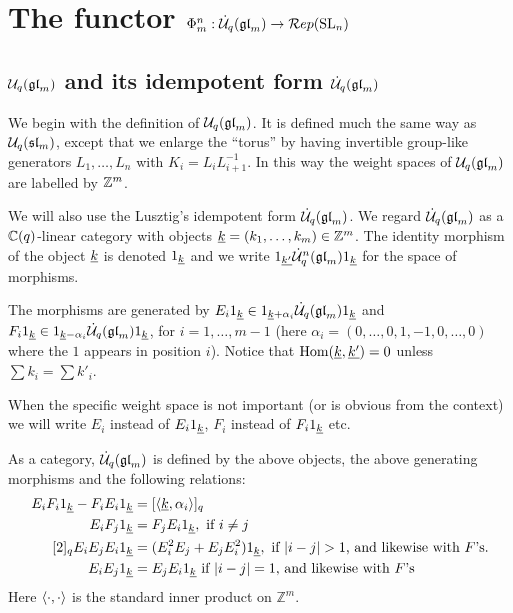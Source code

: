 \documentclass[10pt,leqno]{article}
\begin{document}
\section{The functor $\Phi_m^n:\dot{{\mathcal{U}}}_q({\mathfrak{gl}}_m) \rightarrow \mathcal{R}ep({\rm{SL}}_n)$}\label{sec:phi}

\subsection{$ \mathcal{U}_q({\mathfrak{gl}}_m)$ and its idempotent form $\dot{{\mathcal{U}}}_q({\mathfrak{gl}}_m)$}\label{sec:idemform}
We begin with the definition of $ \mathcal{U}_q({\mathfrak{gl}}_m)$.  It is defined much the same way as $ \mathcal{U}_q({\mathfrak{sl}}_m) $, except that we enlarge the ``torus'' by having invertible group-like generators $ L_1, \dots, L_n $ with $ K_i = L_i L_{i+1}^{-1} $.  In this way the weight spaces of $ \mathcal{U}_q({\mathfrak{gl}}_m) $ are labelled by $ {\mathbb{Z}}^m $.

We will also use the Lusztig's idempotent form $ \dot{{\mathcal{U}}}_q({\mathfrak{gl}}_m) $.
We regard $\dot{{\mathcal{U}}}_q({\mathfrak{gl}}_m)$ as a ${\mathbb{C}}(q)$-linear category with objects $ {\underline{k}} = (k_1, \dots, k_m) \in \mathbb Z^m $.  The identity morphism of the object ${\underline{k}}$ is denoted $1_{\underline{k}}$  and we write $ 1_{\underline{k'}} \dot{{\mathcal{U}}}_q^n({\mathfrak{gl}}_m) 1_{\underline{k}}$ for the space of morphisms.

The morphisms are generated by $E_i 1_{{\underline{k}}} \in 1_{{\underline{k}} + \alpha_i} \dot{{\mathcal{U}}}_q({\mathfrak{gl}}_m) 1_{{\underline{k}}} $ and $ F_i 1_{{\underline{k}}} \in 1_{{\underline{k}} - \alpha_i} \dot{{\mathcal{U}}}_q({\mathfrak{gl}}_m) 1_{{\underline{k}}}$, for $i=1, \dots, m-1$ (here $\alpha_i = (0,\dots,0,1,-1,0,\dots,0)$ where the $1$ appears in position $i$).  Notice that $\operatorname{Hom}({\underline{k}}, {\underline{k'}}) = 0 $ unless $\sum k_i = \sum k'_i$.

\begin{rem} When the specific weight space is not important (or is obvious from the context) we will write $E_i$ instead of $E_i 1_{{\underline{k}}}$, $F_i$ instead of $F_i 1_{{\underline{k}}}$ etc.
\end{rem}

As a category, $\dot{{\mathcal{U}}}_q({\mathfrak{gl}}_m)$ is defined by the above objects, the above generating morphisms and the following relations:
\begin{align}
\label{rel:1} E_i F_i 1_{{\underline{k}}} - F_i E_i 1_{{\underline{k}}} &= [\langle {\underline{k}}, \alpha_i \rangle]_q \\
\label{rel:2}  E_iF_j 1_{{\underline{k}}} &= F_jE_i 1_{{\underline{k}}}, \text{ if $i \ne j$} \\
\label{rel:3} [2]_q E_iE_jE_i 1_{{\underline{k}}} &= (E_i^2 E_j + E_j E_i^2) 1_{{\underline{k}}}, \text{ if $ |i - j| > 1 $, and likewise with $F$'s}. \\
\label{rel:4} E_iE_j 1_{{\underline{k}}} &= E_jE_i 1_{{\underline{k}}} \text{ if $ |i -j| = 1$, and likewise with $F$'s}
\end{align}
Here $\langle \cdot, \cdot \rangle$ is the standard inner product on $\mathbb Z^m$.
\end{document}
